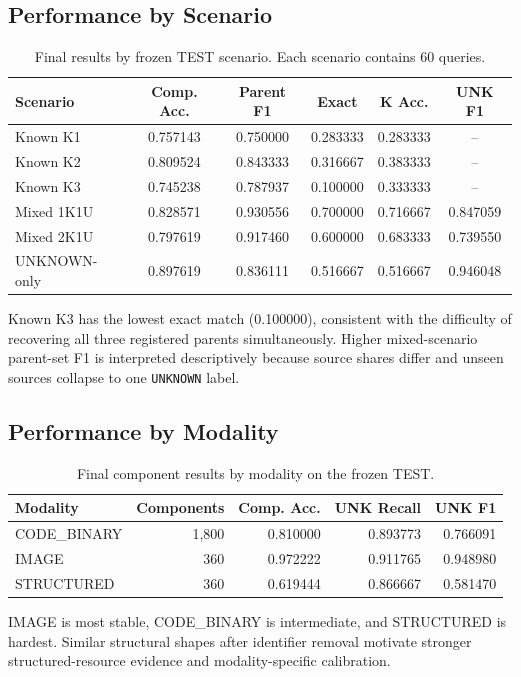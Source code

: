 \documentclass[runningheads]{llncs}
\begin{document}
\subsection{Performance by Scenario}
\begin{table}[!htbp]
\centering
\caption{Final results by frozen TEST scenario. Each scenario contains 60 queries.}
\label{tab:scenarioresult}
\scriptsize
\begin{tabular}{lccccc}
\toprule
Scenario & Comp. Acc. & Parent F1 & Exact & K Acc. & UNK F1\\
\midrule
Known K1 & 0.757143 & 0.750000 & 0.283333 & 0.283333 & --\\
Known K2 & 0.809524 & 0.843333 & 0.316667 & 0.383333 & --\\
Known K3 & 0.745238 & 0.787937 & 0.100000 & 0.333333 & --\\
Mixed 1K1U & 0.828571 & 0.930556 & 0.700000 & 0.716667 & 0.847059\\
Mixed 2K1U & 0.797619 & 0.917460 & 0.600000 & 0.683333 & 0.739550\\
UNKNOWN-only & 0.897619 & 0.836111 & 0.516667 & 0.516667 & 0.946048\\
\bottomrule
\end{tabular}
\end{table}
Known K3 has the lowest exact match (0.100000), consistent with the difficulty of recovering all three registered parents simultaneously. Higher mixed-scenario parent-set F1 is interpreted descriptively because source shares differ and unseen sources collapse to one \texttt{UNKNOWN} label.

\subsection{Performance by Modality}
\begin{table}[!htbp]
\centering
\caption{Final component results by modality on the frozen TEST.}
\label{tab:modality}
\scriptsize
\begin{tabular}{lrrrr}
\toprule
Modality & Components & Comp. Acc. & UNK Recall & UNK F1\\
\midrule
CODE\_BINARY & 1,800 & 0.810000 & 0.893773 & 0.766091\\
IMAGE & 360 & 0.972222 & 0.911765 & 0.948980\\
STRUCTURED & 360 & 0.619444 & 0.866667 & 0.581470\\
\bottomrule
\end{tabular}
\end{table}
IMAGE is most stable, CODE\_BINARY is intermediate, and STRUCTURED is hardest. Similar structural shapes after identifier removal motivate stronger structured-resource evidence and modality-specific calibration.
\end{document}
